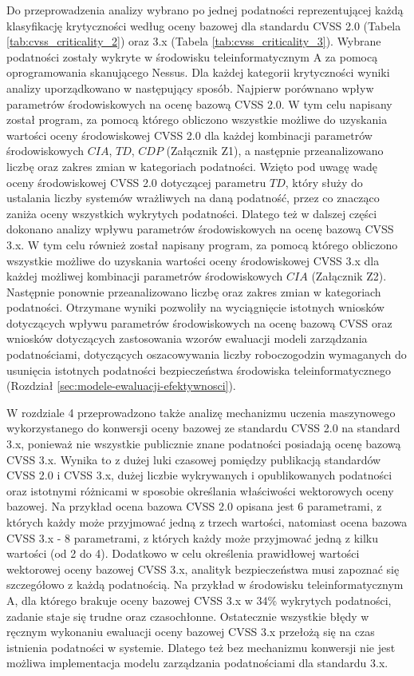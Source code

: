 \bigbreak
Do przeprowadzenia analizy wybrano po jednej podatności reprezentującej każdą klasyfikację krytyczności według oceny bazowej dla standardu CVSS 2.0 (Tabela \ref{tab:cvss_criticality_2}) oraz 3.x (Tabela \ref{tab:cvss_criticality_3}). Wybrane podatności zostały wykryte w środowisku teleinformatycznym A za pomocą oprogramowania skanującego Nessus. Dla każdej kategorii krytyczności wyniki analizy uporządkowano w następujący sposób. Najpierw porównano wpływ parametrów środowiskowych na ocenę bazową CVSS 2.0. W tym celu napisany został program, za pomocą którego obliczono wszystkie możliwe do uzyskania wartości oceny środowiskowej CVSS 2.0 dla każdej kombinacji parametrów środowiskowych $CIA$, $TD$, $CDP$ (Załącznik Z1), a następnie przeanalizowano liczbę oraz zakres zmian w kategoriach podatności. Wzięto pod uwagę wadę oceny środowiskowej CVSS 2.0 dotyczącej parametru $TD$, który służy do ustalania liczby systemów wrażliwych na daną podatność, przez co znacząco zaniża oceny wszystkich wykrytych podatności. Dlatego też w dalszej części dokonano analizy wpływu parametrów środowiskowych na ocenę bazową CVSS 3.x. W tym celu również został napisany program, za pomocą którego obliczono wszystkie możliwe do uzyskania wartości oceny środowiskowej CVSS 3.x dla każdej możliwej kombinacji parametrów środowiskowych $CIA$ (Załącznik Z2). Następnie ponownie przeanalizowano liczbę oraz zakres zmian w kategoriach podatności. Otrzymane wyniki pozwoliły na wyciągnięcie istotnych wniosków dotyczących wpływu parametrów środowiskowych na ocenę bazową CVSS oraz wniosków dotyczących zastosowania wzorów ewaluacji modeli zarządzania podatnościami, dotyczących oszacowywania liczby roboczogodzin wymaganych do usunięcia istotnych podatności bezpieczeństwa środowiska teleinformatycznego (Rozdział \ref{sec:modele-ewaluacji-efektywnosci}).

\bigbreak
W rozdziale 4 przeprowadzono także analizę mechanizmu uczenia maszynowego wykorzystanego do konwersji oceny bazowej ze standardu CVSS 2.0 na standard 3.x, ponieważ nie wszystkie publicznie znane podatności posiadają ocenę bazową CVSS 3.x. Wynika to z dużej luki czasowej pomiędzy publikacją standardów CVSS 2.0 i CVSS 3.x, dużej liczbie wykrywanych i opublikowanych podatności oraz istotnymi różnicami w sposobie określania właściwości wektorowych oceny bazowej. Na przykład ocena bazowa CVSS 2.0 opisana jest 6 parametrami, z których każdy może przyjmować jedną z trzech wartości, natomiast ocena bazowa CVSS 3.x - 8 parametrami, z których każdy może przyjmować jedną z kilku wartości (od 2 do 4). Dodatkowo w celu określenia prawidłowej wartości wektorowej oceny bazowej CVSS 3.x, analityk bezpieczeństwa musi zapoznać się szczegółowo z każdą podatnością. Na przykład w środowisku teleinformatycznym A, dla którego brakuje oceny bazowej CVSS 3.x w 34\% wykrytych podatności, zadanie staje się trudne oraz czasochłonne. Ostatecznie wszystkie błędy w ręcznym wykonaniu ewaluacji oceny bazowej CVSS 3.x przełożą się na czas istnienia podatności w systemie. Dlatego też bez mechanizmu konwersji nie jest możliwa implementacja modelu zarządzania podatnościami dla standardu 3.x.

